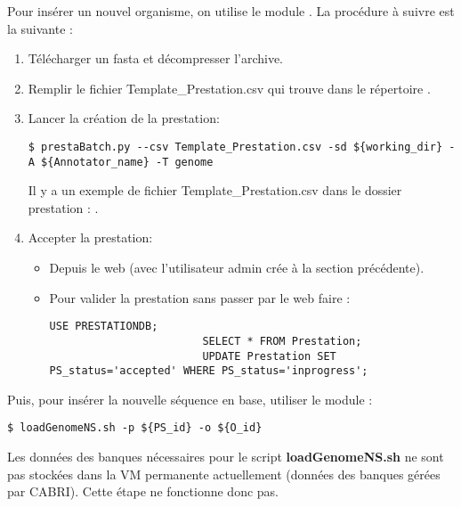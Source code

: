 Pour insérer un nouvel organisme, on utilise le module .
La procédure à suivre est la suivante :
\begin{enumerate}
    \item Télécharger un fasta et décompresser l'archive.
    \item Remplir le fichier Template\_Prestation.csv qui trouve dans le répertoire .
    \item Lancer la création de la prestation:
          \begin{lstlisting}[style=bash]
            $ prestaBatch.py --csv Template_Prestation.csv -sd ${working_dir} -A ${Annotator_name} -T genome
          \end{lstlisting}
          Il y a un exemple de fichier Template\_Prestation.csv dans le dossier prestation : .
    \item Accepter la prestation:
          \begin{itemize}
              \item Depuis le web (avec l'utilisateur admin crée à la section précédente).
              \item Pour valider la prestation sans passer par le web faire :
                    \begin{lstlisting}[style=SQL]
                        USE PRESTATIONDB;
                        SELECT * FROM Prestation;
                        UPDATE Prestation SET PS_status='accepted' WHERE PS_status='inprogress';
                  \end{lstlisting}
           \end{itemize} 
\end{enumerate}

Puis, pour insérer la nouvelle séquence en base, utiliser le module :
\begin{lstlisting}[style=bash]
  $ loadGenomeNS.sh -p ${PS_id} -o ${O_id}
\end{lstlisting}

\begin{mycolorbox}
    Les données des banques nécessaires pour le script \textbf{loadGenomeNS.sh} ne sont pas stockées dans la VM permanente actuellement (données des banques gérées par CABRI).
    Cette étape ne fonctionne donc pas.
\end{mycolorbox}

